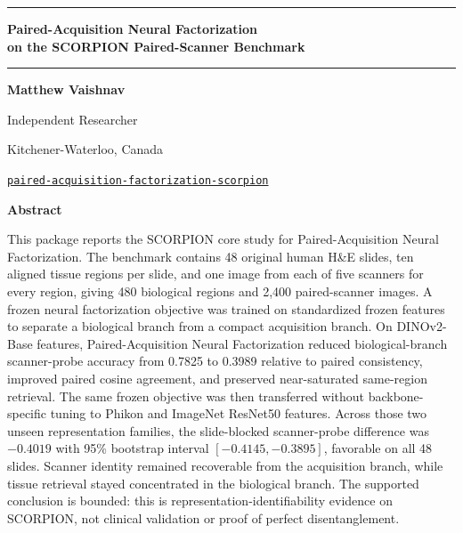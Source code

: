 \documentclass[10pt]{article}
\begin{document}
\begin{center}
\rule{\textwidth}{4pt}
\vspace{0.22in}

{\LARGE\bfseries Paired-Acquisition Neural Factorization\\
on the SCORPION Paired-Scanner Benchmark\par}

\vspace{0.18in}
\rule{\textwidth}{0.4pt}
\vspace{0.32in}

{\bfseries Matthew Vaishnav}\par
Independent Researcher\par
Kitchener-Waterloo, Canada\par
\href{https://github.com/matthewvaishnav/paired-acquisition-factorization-scorpion}{\texttt{paired-acquisition-factorization-scorpion}}
\end{center}

\vspace{0.28in}
\begin{center}
\bfseries Abstract
\end{center}
\begin{center}
\begin{minipage}{0.82\textwidth}
\small
This package reports the SCORPION core study for Paired-Acquisition Neural Factorization. The benchmark contains 48 original human H\&E slides, ten aligned tissue regions per slide, and one image from each of five scanners for every region, giving 480 biological regions and 2,400 paired-scanner images. A frozen neural factorization objective was trained on standardized frozen features to separate a biological branch from a compact acquisition branch. On DINOv2-Base features, Paired-Acquisition Neural Factorization reduced biological-branch scanner-probe accuracy from 0.7825 to 0.3989 relative to paired consistency, improved paired cosine agreement, and preserved near-saturated same-region retrieval. The same frozen objective was then transferred without backbone-specific tuning to Phikon and ImageNet ResNet50 features. Across those two unseen representation families, the slide-blocked scanner-probe difference was $-0.4019$ with 95\% bootstrap interval $[-0.4145,-0.3895]$, favorable on all 48 slides. Scanner identity remained recoverable from the acquisition branch, while tissue retrieval stayed concentrated in the biological branch. The supported conclusion is bounded: this is representation-identifiability evidence on SCORPION, not clinical validation or proof of perfect disentanglement.
\end{minipage}
\end{center}
\vspace{0.28in}
\end{document}
